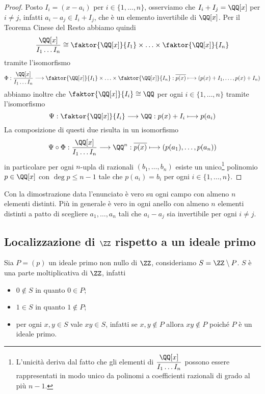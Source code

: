 \documentclass[11pt]{scrartcl}
\begin{document}
	\begin{proof}
		Posto $I_i = (x - a_i)$ per $i \in \{1, \ldots, n\}$, osserviamo che 
		$I_i + I_j = \QQ[x]$ per $i \neq j$, infatti $a_i - a_j \in I_i + I_j$, 
		che è un elemento invertibile di $\QQ[x]$. Per il Teorema Cinese del Resto
		abbiamo quindi
		\[
		\frac{\QQ[x]}{I_1\ldots I_n} \cong \faktor{\QQ[x]}{I_1}\times 
		\ldots \times \faktor{\QQ[x]}{I_n}
		\]
		tramite l'isomorfismo
		\[
		\Phi: \frac{\QQ[x]}{I_1\ldots I_n} \longrightarrow \faktor{\QQ[x]}{I_1}\times 
		\ldots \times \faktor{\QQ[x]}{I_n}: \overline{p(x)}\longmapsto
		(p(x) + I_1, \ldots, p(x) + I_n)
		\]
		abbiamo inoltre che $\faktor{\QQ[x]}{I_i} \cong \QQ$ per ogni $i \in \{1, \ldots, n\}$
		tramite l'isomorfismo
		\[
		\Psi: \faktor{\QQ[x]}{I_i} \longrightarrow \QQ: p(x) + I_i \longmapsto p(a_i)
		\]
		La composizione di questi due risulta in un isomorfismo
		\[
		\Psi\circ\Phi: \frac{\QQ[x]}{I_1\ldots I_n}\longrightarrow \QQ^n:
		\overline{p(x)}\longmapsto (p(a_1), \ldots, p(a_n))
		\]
		in particolare per ogni $n$-upla di razionali $(b_1, \ldots, b_n)$ esiste
		un unico\footnote{
			L'unicità deriva dal fatto che gli elementi di $\displaystyle\frac{\QQ[x]}{I_1\ldots I_n}$
			possono essere rappresentati in modo unico da polinomi a coefficienti 
			razionali di grado al più $n - 1$.
		} polinomio $p \in \QQ[x]$ con $\deg p \leq n - 1$ tale che 
		$p(a_i) = b_i$ per ogni $i \in \{1, \ldots, n\}$.
	\end{proof}
	
	\begin{remark}
		Con la dimostrazione data l'enunciato è vero su ogni campo con almeno 
		$n$ elementi distinti. Più in generale è vero in ogni anello con almeno $n$
		elementi distinti a patto di scegliere $a_1, \ldots, a_n$ tali che $a_i - a_j$
		sia invertibile per ogni $i \neq j$.
	\end{remark}
	
	\newpage
	
	\subsection{Localizzazione di $\ZZ$ rispetto a un ideale primo}
	
	Sia $P = (p)$ un ideale primo non nullo di $\ZZ$, consideriamo $S = \ZZ \setminus P$.
	$S$ è una parte moltiplicativa di $\ZZ$, infatti
	\begin{itemize}
		\item $0 \notin S$ in quanto $0 \in P$;
		\item $1 \in S$ in quanto $1 \notin P$;
		\item per ogni $x, y \in S$ vale $xy \in S$, infatti se $x, y \notin P$
		allora $xy \notin P$ poiché $P$ è un ideale primo.
	\end{itemize}
	
\end{document}
